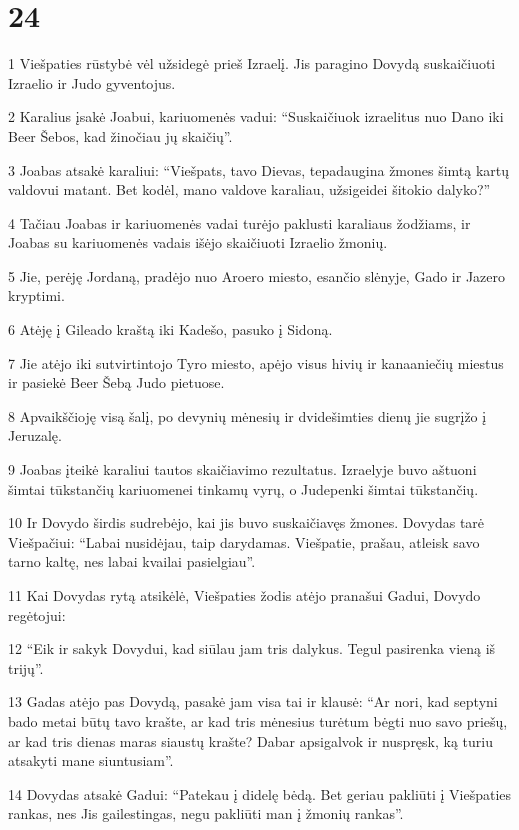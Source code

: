 \chapter{24}

\par 1 Viešpaties rūstybė vėl užsidegė prieš Izraelį. Jis paragino Dovydą suskaičiuoti Izraelio ir Judo gyventojus. 
\par 2 Karalius įsakė Joabui, kariuomenės vadui: “Suskaičiuok izraelitus nuo Dano iki Beer Šebos, kad žinočiau jų skaičių”. 
\par 3 Joabas atsakė karaliui: “Viešpats, tavo Dievas, tepadaugina žmones šimtą kartų valdovui matant. Bet kodėl, mano valdove karaliau, užsigeidei šitokio dalyko?” 
\par 4 Tačiau Joabas ir kariuomenės vadai turėjo paklusti karaliaus žodžiams, ir Joabas su kariuomenės vadais išėjo skaičiuoti Izraelio žmonių. 
\par 5 Jie, perėję Jordaną, pradėjo nuo Aroero miesto, esančio slėnyje, Gado ir Jazero kryptimi. 
\par 6 Atėję į Gileado kraštą iki Kadešo, pasuko į Sidoną. 
\par 7 Jie atėjo iki sutvirtintojo Tyro miesto, apėjo visus hivių ir kanaaniečių miestus ir pasiekė Beer Šebą Judo pietuose. 
\par 8 Apvaikščioję visą šalį, po devynių mėnesių ir dvidešimties dienų jie sugrįžo į Jeruzalę. 
\par 9 Joabas įteikė karaliui tautos skaičiavimo rezultatus. Izraelyje buvo aštuoni šimtai tūkstančių kariuomenei tinkamų vyrų, o Jude­penki šimtai tūkstančių. 
\par 10 Ir Dovydo širdis sudrebėjo, kai jis buvo suskaičiavęs žmones. Dovydas tarė Viešpačiui: “Labai nusidėjau, taip darydamas. Viešpatie, prašau, atleisk savo tarno kaltę, nes labai kvailai pasielgiau”. 
\par 11 Kai Dovydas rytą atsikėlė, Viešpaties žodis atėjo pranašui Gadui, Dovydo regėtojui: 
\par 12 “Eik ir sakyk Dovydui, kad siūlau jam tris dalykus. Tegul pasirenka vieną iš trijų”. 
\par 13 Gadas atėjo pas Dovydą, pasakė jam visa tai ir klausė: “Ar nori, kad septyni bado metai būtų tavo krašte, ar kad tris mėnesius turėtum bėgti nuo savo priešų, ar kad tris dienas maras siaustų krašte? Dabar apsigalvok ir nuspręsk, ką turiu atsakyti mane siuntusiam”. 
\par 14 Dovydas atsakė Gadui: “Patekau į didelę bėdą. Bet geriau pakliūti į Viešpaties rankas, nes Jis gailestingas, negu pakliūti man į žmonių rankas”. 

